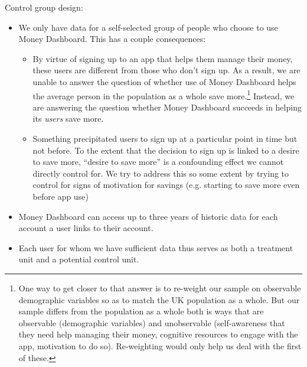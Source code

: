 Control group design:
\begin{itemize}

    \item We only have data for a self-selected group of people who choose to
        use Money Dashboard. This has a couple consequences:

        \begin{itemize}

            \item By virtue of signing up to an app that helps them manage
                their money, these users are different from those who don't
                sign up. As a result, we are unable to answer the question of
                whether use of Money Dashboard helps the average person in the
                population as a whole save more.\footnote{One way to get closer
                    to that answer is to re-weight our sample on observable
                    demographic variables so as to match the UK population as a
                    whole. But our sample differs from the population as a
                    whole both is ways that are observable (demographic
                    variables) and unobservable (self-awareness that they need
                    help managing their money, cognitive resources to engage
                    with the app, motivation to do so). Re-weighting would only
                    help us deal with the first of these.} Instead, we are
                    answering the question whether Money Dashboard succeeds in
                    helping its \textit{users} save more.

                \item Something precipitated users to sign up at a particular
                    point in time but not before. To the extent that the
                    decision to sign up is linked to a desire to save more,
                    ``desire to save more'' is a confounding effect we cannot
                    directly control for. We try to address this so some extent
                    by trying to control for signs of motivation for savings
                    (e.g. starting to save more even before app use)
        \end{itemize}

    \item Money Dashboard can access up to three years of historic data for
        each account a user links to their account.

    \item Each user for whom we have sufficient data thus serves as both a
        treatment unit and a potential control unit.


\end{itemize}
